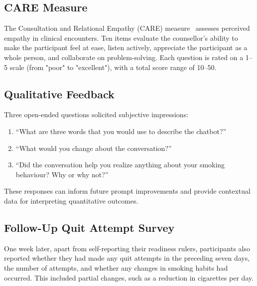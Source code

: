 \subsection{CARE Measure}
\label{subsec:care}
The Consultation and Relational Empathy (CARE) measure~\citep{10.1093/fampra/cmh621,Bikker2015} assesses perceived empathy in clinical encounters. Ten items evaluate the counsellor's ability to make the participant feel at ease, listen actively, appreciate the participant as a whole person, and collaborate on problem-solving. Each question is rated on a 1--5 scale (from "poor" to "excellent"), with a total score range of 10--50.

\subsection{Qualitative Feedback}
Three open-ended questions solicited subjective impressions:
\begin{enumerate}
	\item ``What are three words that you would use to describe the chatbot?''
	\item ``What would you change about the conversation?''
	\item ``Did the conversation help you realize anything about your smoking behaviour? Why or why not?''
\end{enumerate}
These responses can inform future prompt improvements and provide contextual data for interpreting quantitative outcomes.

\subsection{Follow-Up Quit Attempt Survey}
One week later, apart from self-reporting their readiness rulers, participants also reported whether they had made any quit attempts in the preceding seven days, the number of attempts, and whether any changes in smoking habits had occurred. This included partial changes, such as a reduction in cigarettes per day.

